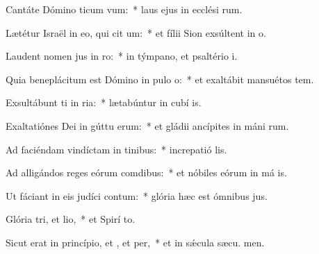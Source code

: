 \item Cantáte Dómino ticum vum:~* laus ejus in ecclési rum.
\item Lætétur Israël in eo, qui cit um:~* et fílii Sion exsúltent in  o.
\item Laudent nomen jus in ro:~* in týmpano, et psaltério  i.
\item Quia beneplácitum est Dómino in pulo o:~* et exaltábit mansuétos  tem.
\item Exsultábunt ti in ria:~* lætabúntur in cubí is.
\item Exaltatiónes Dei in gúttu erum:~* et gládii ancípites in máni rum.
\item Ad faciéndam vindíctam in tinibus:~* increpatió  lis.
\item Ad alligándos reges eórum  comdibus:~* et nóbiles eórum in má is.
\item Ut fáciant in eis judíci contum:~* glória hæc est ómnibus  jus.
\item Glória tri, et lio,~* et Spirí to.
\item Sicut erat in princípio, et , et per,~* et in sǽcula sæcu. men.
